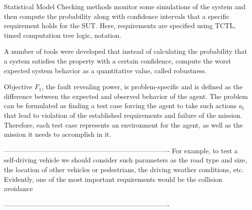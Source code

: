 Statistical Model Checking methods monitor some simulations of the system and then compute the probability along with confidence intervals that a specific requirement holds for the SUT. Here, requirements are specified using TCTL, timed computation tree logic, notation.

A number of tools were developed that instead of calculating the probability that a system satisfies the property with a certain confidence, compute the worst expected system behavior as a quantitative value, called robustness.


Objective $ F_1 $, the fault revealing power, is problem-specific and is defined as the difference between the expected and observed behavior of the agent.
The problem can be formulated as finding a test case forcing the agent to take such actions $ a_t $ that lead to violation of the established requirements and failure of the mission.
Therefore, each test case represents an environment for the agent, as well as the mission it needs to accomplish in it.


-------------------------------------------------------------------------\newline
For example, to test a self-driving vehicle we should
consider such parameters as the road type and size, the
location of other vehicles or pedestrians, the driving weather
conditions, etc. Evidently, one of the most important requirements would be the collision avoidance

-------------------------------------------------------------------------\newline